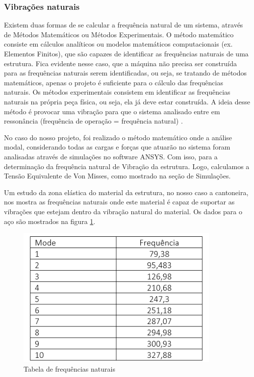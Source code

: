 \subsubsection{Vibrações naturais}

Existem duas formas de se calcular a frequência natural de um sistema, através de Métodos Matemáticos ou Métodos Experimentais. O método matemático consiste em cálculos analíticos ou modelos matemáticos computacionais (ex. Elementos Finitos), que são capazes de identificar as frequências naturais de uma estrutura. Fica evidente nesse caso, que a máquina não precisa ser construída para as frequências naturais serem identificadas, ou seja, se tratando de métodos matemáticos, apenas o projeto é suficiente para o cálculo das frequências naturais. Os métodos experimentais consistem em identificar as frequências naturais na própria peça física, ou seja, ela já deve estar construída. A ideia desse método é provocar uma vibração para que o sistema analisado entre em ressonância (frequência de operação = frequência natural) \cite{nobrega2014}.

No caso do nosso projeto, foi realizado o método matemático onde a análise modal, considerando todas as cargas e forças que atuarão no sistema foram analisadas através de simulações no software ANSYS. Com isso, para a determinação da frequência natural de Vibração da estrutura.  Logo, calculamos a Tensão Equivalente de Von Misses, como mostrado na seção de Simulações.

Um estudo da zona elástica do material da estrutura, no nosso caso a cantoneira, nos mostra as frequências naturais onde este material é capaz de suportar as vibrações que estejam dentro da vibração natural do material. Os dados para o aço são mostrados na figura \ref{fig:tabela_frequencia}.
\begin{figure}[H]
	\centering
	\includegraphics[width=10cm]{figuras/tabela_frequencia.png}
	\caption{Tabela de frequências naturais}
	\label{fig:tabela_frequencia}
\end{figure}


